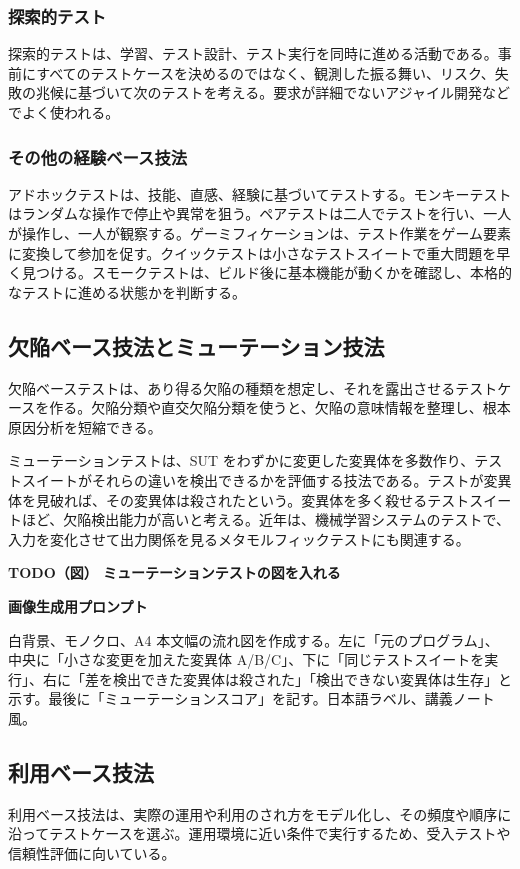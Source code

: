 \documentclass[uplatex,dvipdfmx,a4paper,11pt,nomag]{jsarticle}
\newenvironment{todobox}[2]{\par\medskip\begin{framed}\noindent\textbf{TODO（図） #1}\par\smallskip\noindent\textbf{画像生成用プロンプト}\par\smallskip\noindent #2\par\smallskip}{\end{framed}\par\medskip}
\begin{document}
\subsubsection{探索的テスト}
探索的テストは、学習、テスト設計、テスト実行を同時に進める活動である。事前にすべてのテストケースを決めるのではなく、観測した振る舞い、リスク、失敗の兆候に基づいて次のテストを考える。要求が詳細でないアジャイル開発などでよく使われる。

\subsubsection{その他の経験ベース技法}
アドホックテストは、技能、直感、経験に基づいてテストする。モンキーテストはランダムな操作で停止や異常を狙う。ペアテストは二人でテストを行い、一人が操作し、一人が観察する。ゲーミフィケーションは、テスト作業をゲーム要素に変換して参加を促す。クイックテストは小さなテストスイートで重大問題を早く見つける。スモークテストは、ビルド後に基本機能が動くかを確認し、本格的なテストに進める状態かを判断する。

\subsection{欠陥ベース技法とミューテーション技法}
欠陥ベーステストは、あり得る欠陥の種類を想定し、それを露出させるテストケースを作る。欠陥分類や直交欠陥分類を使うと、欠陥の意味情報を整理し、根本原因分析を短縮できる。

ミューテーションテストは、SUT をわずかに変更した変異体を多数作り、テストスイートがそれらの違いを検出できるかを評価する技法である。テストが変異体を見破れば、その変異体は殺されたという。変異体を多く殺せるテストスイートほど、欠陥検出能力が高いと考える。近年は、機械学習システムのテストで、入力を変化させて出力関係を見るメタモルフィックテストにも関連する。

\begin{todobox}{ミューテーションテストの図を入れる}{白背景、モノクロ、A4 本文幅の流れ図を作成する。左に「元のプログラム」、中央に「小さな変更を加えた変異体 A/B/C」、下に「同じテストスイートを実行」、右に「差を検出できた変異体は殺された」「検出できない変異体は生存」と示す。最後に「ミューテーションスコア」を記す。日本語ラベル、講義ノート風。}
\end{todobox}

\subsection{利用ベース技法}
利用ベース技法は、実際の運用や利用のされ方をモデル化し、その頻度や順序に沿ってテストケースを選ぶ。運用環境に近い条件で実行するため、受入テストや信頼性評価に向いている。
\end{document}
